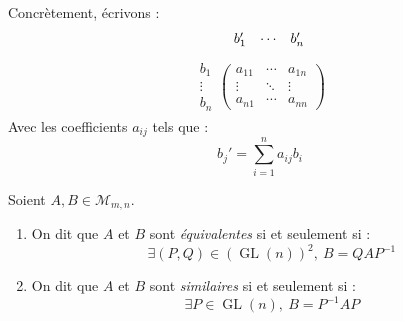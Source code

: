\par \noindent Concrètement, écrivons : 
\begin{align*}
    \hspace{0.45cm}
    \begin{matrix}
        b_1' & \cdots & b_n' 
    \end{matrix}
\end{align*}
\vspace{-1.1cm}
\begin{align*}
    \begin{matrix}
        b_1 \\
        \vdots \\ 
        b_n
    \end{matrix}
    \begin{pmatrix}
        a_{11} & \cdots & a_{1n} \\
        \vdots & \ddots & \vdots \\ 
        a_{n1} & \cdots & a_{nn}
    \end{pmatrix}
\end{align*}
Avec les coefficients $a_{ij}$ tels que :
\[ b_j' = \sum_{i=1}^{n} a_{ij} b_i  \]

\begin{definition}
    Soient $A, B \in \mathcal{M}_{m,n}$.
    \begin{enumerate}
        \item On dit que $A$ et $B$ sont \emph{équivalentes} si et seulement si : 
        \[ \exists (P, Q) \in (\operatorname{GL}(n))^2,\ B = Q A P^{-1} \]
        \item On dit que $A$ et $B$ sont \emph{similaires} si et seulement si :
        \[ \exists P \in \operatorname{GL}(n),\ B = P^{-1} A P \]
    \end{enumerate}
\end{definition}

